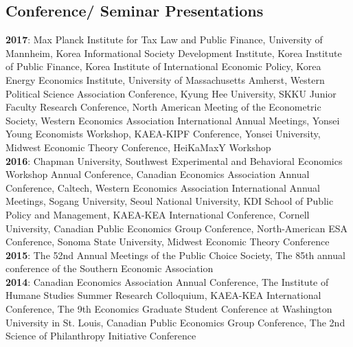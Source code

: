 \documentclass[margin]{res}
\begin{document}
\begin{resume}
\section{Conference/ Seminar Presentations}
\textbf{2017}: Max Planck Institute for Tax Law and Public Finance, University of Mannheim, Korea Informational Society Development Institute, Korea Institute of Public Finance, Korea Institute of International Economic Policy, Korea Energy Economics Institute, University of Massachusetts Amherst, Western Political Science Association Conference, Kyung Hee University, SKKU Junior Faculty Research Conference, North American Meeting of the Econometric Society, Western Economics Association International Annual Meetings, Yonsei Young Economists Workshop, KAEA-KIPF Conference, Yonsei University, Midwest Economic Theory Conference, HeiKaMaxY Workshop\\
\textbf{2016}: Chapman University, Southwest Experimental and Behavioral Economics Workshop Annual Conference, Canadian Economics Association Annual Conference, Caltech, Western Economics Association International Annual Meetings, Sogang University, Seoul National University, KDI School of Public Policy and Management, KAEA-KEA International Conference, Cornell University, Canadian Public Economics Group Conference, North-American ESA Conference, Sonoma State University, Midwest Economic Theory Conference\\
\textbf{2015}: The 52nd Annual Meetings of the Public Choice Society, The 85th annual conference of the Southern Economic Association\\
\textbf{2014}: Canadian Economics Association Annual Conference, The Institute of Humane Studies Summer Research Colloquium, KAEA-KEA International Conference, The 9th Economics Graduate Student Conference at Washington University in St. Louis, Canadian Public Economics Group Conference, The 2nd Science of Philanthropy Initiative Conference


\end{resume}
\end{document}
